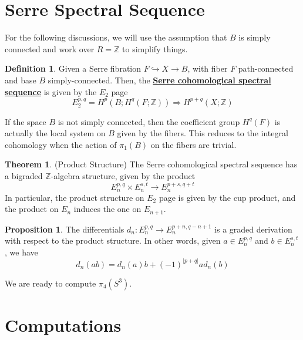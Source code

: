 \documentclass{article}
\theoremstyle{definition}
\newtheorem{theorem}{Theorem}[section]
\theoremstyle{definition}
\theoremstyle{definition}
\newtheorem{proposition}{Proposition}[section]
\theoremstyle{definition}
\theoremstyle{definition}
\newtheorem{definition}{Definition}[section]
\theoremstyle{definition}
\theoremstyle{definition}
\begin{document}
\section{Serre Spectral Sequence}
For the following discussions, we will use the assumption that $B$ is simply connected and work over $R=\mathbb{Z}$ to simplify things. 
\begin{tcolorbox}[colback=purple!5!white,colframe=purple!75!black]
\begin{definition}
Given a Serre fibration $F\hookrightarrow X\to B$, with fiber $F$ path-connected and base $B$ simply-connected. Then, the \underline{\textbf{Serre cohomological spectral sequence}} is given by the $E_2$ page
\[
E_2^{p,q}=H ^{p}(B; H ^{q}(F; \mathbb{Z})) \Longrightarrow H ^{p+q}(X; \mathbb{Z})
\]
\end{definition}
\end{tcolorbox}
If the space $B$ is not simply connected, then the coefficient group $H ^{q}(F)$ is actually the local system on $B$ given by the fibers. This reduces to the integral cohomology when the action of $\pi_1(B)$ on the fibers are trivial.


\begin{tcolorbox}[colback=red!5!white,colframe=red!30!white]
\begin{theorem}
(Product Structure) The Serre cohomological spectral sequence has a bigraded $\mathbb{Z}$-algebra structure, given by the product 
\[
E_n^{p,q}\times E_n^{s,t}\to E_n ^{p+s,q+t}
\]
In particular, the product structure on $E_2$ page is given by the cup product, and the product on $E_n$ induces the one on $E_{n+1}$.
\end{theorem}
\end{tcolorbox}


\begin{tcolorbox}[colback=blue!5!white,colframe=blue!30!white]
\begin{proposition}
    The differentials $d_n: E_n ^{p,q}\to E_n ^{p+n, q-n+1}$ is a graded derivation with respect to the product structure. In other words, given $a\in E_n ^{p,q}$ and $b\in E_n^{s,t}$, we have 
    \[
        d_n(ab)=d_n(a)b+(-1)^{|p+q|}ad_n(b) 
    \]
\end{proposition}
\end{tcolorbox}
We are ready to compute $\pi_4(S^3)$.

\section{Computations}
\end{document}
